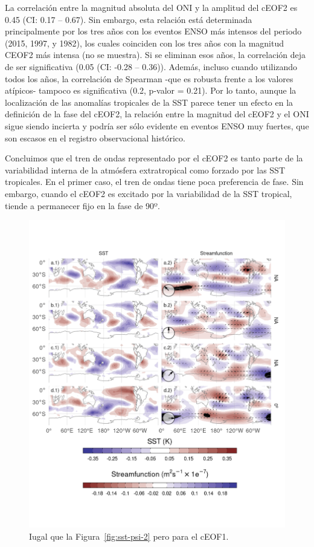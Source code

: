 \documentclass[12pt,oneside]{reedthesis}
\begin{document}
La correlación entre la magnitud absoluta del ONI y la amplitud del cEOF2 es 0.45 (CI: 0.17 -- 0.67).
Sin embargo, esta relación está determinada principalmente por los tres años con los eventos ENSO más intensos del periodo (2015, 1997, y 1982), los cuales coinciden con los tres años con la magnitud CEOF2 más intensa (no se muestra).
Si se eliminan esos años, la correlación deja de ser significativa (0.05 (CI: -0.28 -- 0.36)).
Además, incluso cuando utilizando todos los años, la correlación de Spearman -que es robusta frente a los valores atípicos- tampoco es significativa (0.2, p-valor = 0.21).
Por lo tanto, aunque la localización de las anomalías tropicales de la SST parece tener un efecto en la definición de la fase del cEOF2, la relación entre la magnitud del cEOF2 y el ONI sigue siendo incierta y podría ser sólo evidente en eventos ENSO muy fuertes, que son escasos en el registro observacional histórico.

Concluimos que el tren de ondas representado por el cEOF2 es tanto parte de la variabilidad interna de la atmósfera extratropical como forzado por las SST tropicales.
En el primer caso, el tren de ondas tiene poca preferencia de fase.
Sin embargo, cuando el cEOF2 es excitado por la variabilidad de la SST tropical, tiende a permanecer fijo en la fase de 90º.



\begin{figure}
\includegraphics{figures/20-ceofs/sst-psi-1-1} \caption{Iugal que la Figura~\ref{fig:sst-psi-2} pero para el cEOF1.}\label{fig:sst-psi-1}
\end{figure}
\end{document}
